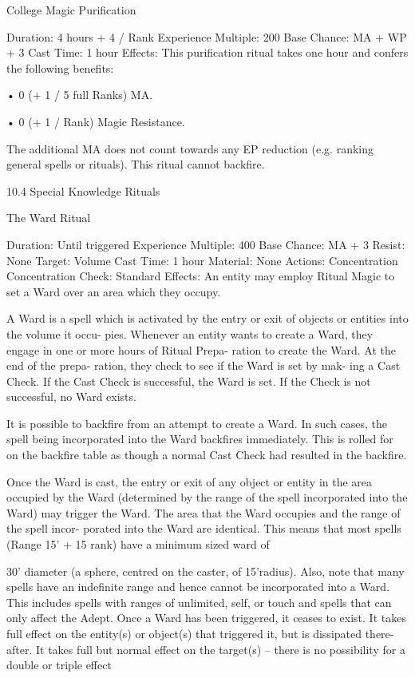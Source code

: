 \begin{Chapter}{College Magic}
Purification 

Duration: 4 hours + 4 / Rank 
Experience Multiple: 200 
Base Chance: MA + WP + 3%
Cast Time: 1 hour 
Effects: This purification ritual takes one hour and 
confers the following benefits:  

• 0 (+ 1 / 5 full Ranks) MA.  

• 0 (+ 1 / Rank) Magic Resistance. 

The additional MA does not count towards any EP 
reduction  (e.g.  ranking  general  spells  or  rituals). 
This ritual cannot backfire. 

10.4 Special Knowledge Rituals 

The Ward Ritual 

Duration: Until triggered 
Experience Multiple: 400 
Base Chance: MA + 3%
Resist: None 
Target: Volume 
Cast Time: 1 hour 
Material: None 
Actions: Concentration 
Concentration Check: Standard 
Effects: An entity may employ Ritual Magic to set 
a Ward over an area which they occupy. 

A Ward is a spell which is activated by the entry or 
exit  of  objects  or  entities  into  the  volume  it  occu-
pies.  Whenever  an  entity  wants  to  create  a  Ward, 
they engage in one or more hours of Ritual Prepa-
ration to create the Ward. At the end of the prepa-
ration, they check to see if the Ward is set by mak-
ing  a Cast Check.  If  the  Cast  Check is  successful, 
the Ward  is  set.  If  the  Check is  not successful,  no 
Ward exists. 

It is possible to backfire from an attempt to create a 
Ward.  In  such  cases,  the  spell  being  incorporated 
into the Ward backfires immediately. This is rolled 
for  on  the  backfire  table  as  though  a  normal  Cast 
Check had resulted in the backfire. 

Once  the  Ward  is  cast,  the  entry  or  exit  of  any 
object  or  entity  in  the  area  occupied  by  the  Ward 
(determined by  the  range  of  the  spell  incorporated 
into the Ward) may trigger the Ward. The area that 
the Ward occupies and the range of the spell incor-
porated  into  the  Ward  are  identical.  This  means 
that  most  spells  (Range  15’  +  15  rank)  have  a 
minimum sized ward of 

30’  diameter  (a  sphere,  centred  on  the  caster,  of 
15’radius).  Also,  note  that  many  spells  have  an 
indefinite  range  and  hence  cannot  be  incorporated 
into  a  Ward.  This  includes  spells  with  ranges  of 
unlimited,  self,  or  touch  and  spells  that  can  only 
affect the Adept. Once a Ward has been triggered, 
it ceases to exist. It takes full effect on the entity(s) 
or object(s) that triggered it, but is dissipated there-
after. It takes full but normal effect on the target(s) 
– there is no possibility for a double or triple effect 


\end{Chapter}
